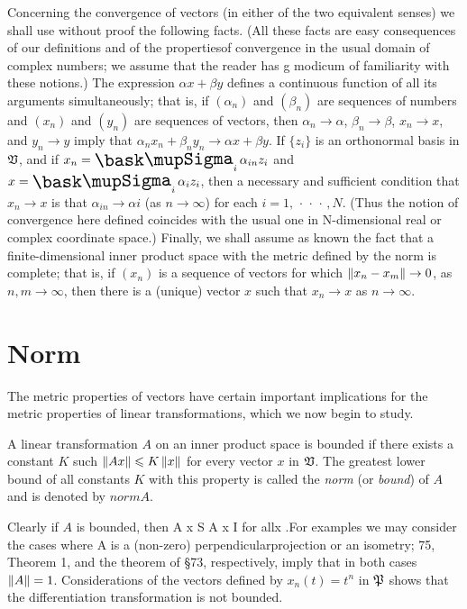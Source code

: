 Concerning the convergence of vectors (in either of the two equivalent senses)
we shall use without proof the following facts. (All these facts are easy
consequences of our definitions and of the propertiesof convergence in the usual
domain of complex numbers; we assume that the reader has g modicum of
familiarity with these notions.) The expression \(\alpha x + \beta y\) defines a
continuous function of all its arguments simultaneously; that is, if
\((\alpha_n)\) and \((\beta_n)\) are sequences of numbers and \((x_n)\) and
\((y_n)\) are sequences of vectors, then \(\alpha_n \to \alpha\), \(\beta_n \to
\beta\), \(x_n \to x\), and \(y_n \to y\) imply that \(\alpha_n x_n + \beta_n
y_n \to \alpha x + \beta y\). If \(\{z_i\}\) is an orthonormal basis in
\(\mathfrak{V}\), and if \(x_n =\sumx_i \alpha_{in}z_i\) and \(x = \sumx_i \alpha_i
z_i\), then a necessary and sufficient condition that \(x_n \to x\) is that
\(\alpha_{in} \to \alpha{i}\) (as \(n \to \infty\)) for each \(i = 1,
\,\cdot\,\cdot\,\cdot\,, N\). (Thus the notion of convergence here defined
coincides with the usual one in N-dimensional real or complex coordinate space.)
Finally, we shall assume as known the fact that a finite-dimensional inner
product space with the metric defined by the norm is complete; that is, if
\((x_n)\) is a sequence of vectors for which \(\left\lVert x_n - x_m\right\rVert \to 0\), as \(n,
m \to \infty\), then there is a (unique) vector \(x\) such that \(x_n \to x\) as
\(n \to \infty\).


\section{Norm}
The metric properties of vectors have certain important implications for the
metric properties of linear transformations, which we now begin to study.

\begin{definition}
    A linear transformation \(A\) on an inner product space is bounded if there
    exists a constant \(K\) such \(\left\lVert Ax\right\rVert \leqslant K\left\lVert x\right\rVert\) for every vector
    \(x\) in \(\mathfrak{V}\). The greatest lower bound of all constants \(K\) with
    this property is called the \emph{norm} (or \emph{bound}) of \(A\) and is
    denoted by \(norm{A}\).
\end{definition}

Clearly if \(A\) is bounded, then A x S A x I for allx .For examples we may
consider the cases where A is a (non-zero) perpendicularprojection or an
isometry; 75, Theorem 1, and the theorem of §73, respectively, imply that in
both cases \(\left\lVert A\right\rVert = 1\). Considerations of the vectors defined by \(x_n(t) = t^n\)
in \(\mathfrak{P}\) shows that the differentiation transformation is not bounded.

